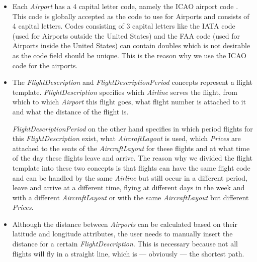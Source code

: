 \documentclass[a4paper,11pt]{article}
\newcommand{\spar}{\par \noindent}
\newcommand{\dsltype}[1]{\textit{#1}}
\begin{document}
\begin{itemize}
\item Each \dsltype{Airport} has a 4 capital letter code, namely the ICAO airport code \citep{icao_airport}. This code is globally accepted as the code to use for Airports and consists of 4 capital letters. Codes consisting of 3 capital letters like the IATA code \citep{iata_airport} (used for Airports outside the United States) and the FAA code \citep{faa_airport} (used for Airports inside the United States) can contain doubles which is not desirable as the code field should be unique. This is the reason why we use the ICAO code for the airports.

\item The \dsltype{FlightDescription} and \dsltype{FlightDescriptionPeriod} concepts represent a flight template. \dsltype{FlightDescription} specifies which \dsltype{Airline} serves the flight, from which to which \dsltype{Airport} this flight goes, what flight number is attached to it and what the distance of the flight is.
\spar \dsltype{FlightDescriptionPeriod} on the other hand specifies in which period flights for this \dsltype{FlightDescription} exist, what \dsltype{AircraftLayout} is used, which \dsltype{Prices} are attached to the seats of the \dsltype{AircraftLayout} for these flights and at what time of the day these flights leave and arrive. The reason why we divided the flight template into these two concepts is that flights can have the same flight code and can be handled by the same \dsltype{Airline} but still occur in a different period, leave and arrive at a different time, flying at different days in the week and with a different \dsltype{AircraftLayout} or with the same \dsltype{AircraftLayout} but different \dsltype{Prices}.

\item Although the distance between \dsltype{Airports} can be calculated based on their latitude and longitude attributes, the user needs to manually insert the distance for a certain \dsltype{FlightDescription}. This is necessary because not all flights will fly in a straight line, which is --- obviously --- the shortest path.
\end{itemize}
\end{document}
